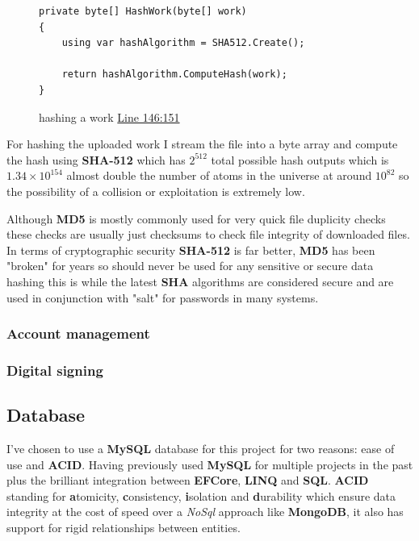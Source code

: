 \documentclass[12pt]{article}
\begin{document}
\begin{figure}[H]
\caption{hashing a work \href{https://github.com/MrHarrisonBarker/CRPL/blob/main/CRPL.Web/Services/WorksVerificationService.cs}{Line 146:151}}
\centering
\begin{lstlisting}[language=CSharp]
private byte[] HashWork(byte[] work)
{
	using var hashAlgorithm = SHA512.Create();

	return hashAlgorithm.ComputeHash(work);
}
\end{lstlisting}
\end{figure}

For hashing the uploaded work I stream the file into a byte array and compute the hash using \textbf{SHA-512} which has \(2^{512}\) total possible hash outputs which is \(1.34 \times 10^{154}\) almost double the number of atoms in the universe at around \(10^{82}\) so the possibility of a collision or exploitation is extremely low. 

Although \textbf{MD5} is mostly commonly used for very quick file duplicity checks these checks are usually just checksums to check file integrity of downloaded files. In terms of cryptographic security \textbf{SHA-512} is far better, \textbf{MD5} has been "broken" for years so should never be used for any sensitive or secure data hashing this is while the latest \textbf{SHA} algorithms are considered secure and are used in conjunction with "salt" for passwords in many systems.

\subsubsection{Account management}
\subsubsection{Digital signing}

\subsection{Database}

I've chosen to use a \textbf{MySQL} database for this project for two reasons: ease of use and \textbf{ACID}. Having previously used \textbf{MySQL} for multiple projects in the past plus the brilliant integration between \textbf{EFCore}, \textbf{LINQ} and \textbf{SQL}. \textbf{ACID} standing for \textbf{a}tomicity, \textbf{c}onsistency, \textbf{i}solation and \textbf{d}urability which ensure data integrity at the cost of speed over a \textit{NoSql} approach like \textbf{MongoDB}, it also has support for rigid relationships between entities.
\end{document}
